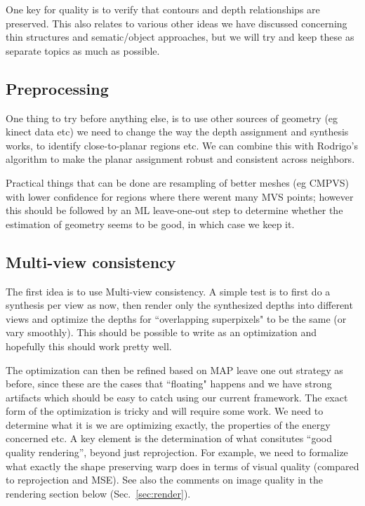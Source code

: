 \documentclass{article}
\begin{document}
One key for quality is to verify that contours and depth relationships are preserved. 
This also relates to various other ideas we have discussed concerning
thin structures and sematic/object approaches, but we will try and keep these
as separate topics as much as possible.

\subsection{Preprocessing}
One thing to try before anything else, is to use
other sources of geometry (eg kinect data etc) we need to change the way the depth
assignment and synthesis works, to identify close-to-planar regions etc. We can combine this
with Rodrigo's algorithm to make the planar assignment robust and consistent across neighbors.

Practical things that can be done are resampling of better meshes (eg CMPVS) with lower confidence
for regions where there werent many MVS points; however this should be followed by
an ML leave-one-out step to determine whether the estimation of geometry seems to be
good, in which case we keep it.


\subsection{Multi-view consistency}
\label{sec:mvcons}

The first idea is to use Multi-view consistency.
A simple test is to first do a synthesis per view as now, then render only the synthesized depths into
different views and optimize the depths for ``overlapping superpixels" to be the same (or vary smoothly). This should be possible to write as an optimization and hopefully this should work pretty well.

The optimization can then be refined based on MAP leave one out strategy as before,
since these are the cases that ``floating" happens and we have strong artifacts which should be easy to catch using our current framework.
The exact form of the optimization is tricky and will require some work.
We need to determine what it is we are optimizing exactly, the properties
of the energy concerned etc.
A key element is the determination of what consitutes ``good quality rendering'', beyond
just reprojection. For example, we need to formalize what exactly the shape preserving
warp does in terms of visual quality (compared to reprojection and MSE).
See also the comments on image quality in the rendering section below (Sec.~\ref{sec:render}).
\end{document}
